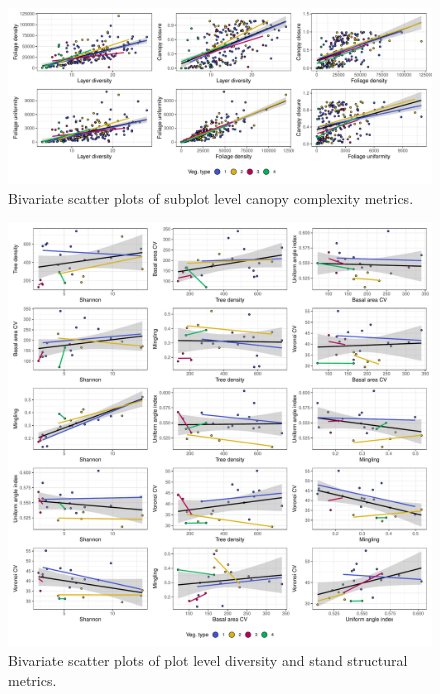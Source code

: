 \begin{refsection}
\begin{supplement}
\begin{figure}[H]
	\includegraphics[width=\linewidth]{img/canopy_metric_comp_subplot}
	\caption[Bivariate plots of subplot canopy complexity metrics]{Bivariate scatter plots of subplot level canopy complexity metrics.}
	\label{tls:canopy_metric_comp_subplot}
\end{figure}

\begin{figure}[H]
	\includegraphics[width=\linewidth]{img/pred_comp_plot}
	\caption[Bivariate plots of plot diversity and stand structural metrics]{Bivariate scatter plots of plot level diversity and stand structural metrics.}
	\label{tls:pred_comp_plot}
\end{figure}


\end{supplement}
\end{refsection}
